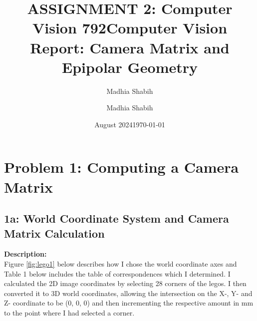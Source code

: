 \documentclass{article}
\title{ASSIGNMENT 2: Computer Vision 792}
\author{Madhia Shabih}
\date{August 2024}
\title{Computer Vision Report: Camera Matrix and Epipolar Geometry}
\author{Madhia Shabih}
\date{\today}
\begin{document}
\maketitle

\section{Problem 1: Computing a Camera Matrix}

\subsection{1a: World Coordinate System and Camera Matrix Calculation}
\textbf{Description:} \\
Figure \ref{fig:lego1} below describes how I chose the world coordinate axes and Table 1 below includes the table of correspondences which I 
determined. I calculated the 2D image coordinates by selecting 28 corners of the legos. I then converted it to 3D world coordinates,
allowing the intersection on the X-, Y- and Z- coordinate to be (0, 0, 0) and then incrementing the respective amount in mm to the point where 
I had selected a corner.
\end{document}
